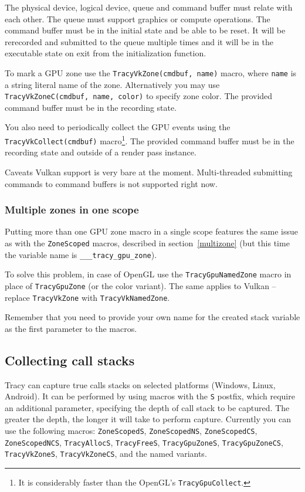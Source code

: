 \documentclass[hidelinks,titlepage,a4paper]{article}
\begin{document}
The physical device, logical device, queue and command buffer must relate with each other. The queue must support graphics or compute operations. The command buffer must be in the initial state and be able to be reset. It will be rerecorded and submitted to the queue multiple times and it will be in the executable state on exit from the initialization function.

To mark a GPU zone use the \texttt{TracyVkZone(cmdbuf, name)} macro, where \texttt{name} is a string literal name of the zone. Alternatively you may use \texttt{TracyVkZoneC(cmdbuf, name, color)} to specify zone color. The provided command buffer must be in the recording state.

You also need to periodically collect the GPU events using the \texttt{TracyVkCollect(cmdbuf)} macro\footnote{It is considerably faster than the OpenGL's \texttt{TracyGpuCollect}.}. The provided command buffer must be in the recording state and outside of a render pass instance.

\begin{bclogo}[
noborder=true,
couleur=black!5,
logo=\bcattention
]{Caveats}
Vulkan support is very bare at the moment. Multi-threaded submitting commands to command buffers is not supported right now.
\end{bclogo}

\subsubsection{Multiple zones in one scope}

Putting more than one GPU zone macro in a single scope features the same issue as with the \texttt{ZoneScoped} macros, described in section~\ref{multizone} (but this time the variable name is \texttt{\_\_\_tracy\_gpu\_zone}).

To solve this problem, in case of OpenGL use the \texttt{TracyGpuNamedZone} macro in place of \texttt{TracyGpuZone} (or the color variant). The same applies to Vulkan -- replace \texttt{TracyVkZone} with \texttt{TracyVkNamedZone}.

Remember that you need to provide your own name for the created stack variable as the first parameter to the macros.

\subsection{Collecting call stacks}

Tracy can capture true calls stacks on selected platforms (Windows, Linux, Android). It can be performed by using macros with the \texttt{S} postfix, which require an additional parameter, specifying the depth of call stack to be captured. The greater the depth, the longer it will take to perform capture. Currently you can use the following macros: \texttt{ZoneScopedS}, \texttt{ZoneScopedNS}, \texttt{ZoneScopedCS}, \texttt{ZoneScopedNCS}, \texttt{TracyAllocS}, \texttt{TracyFreeS}, \texttt{TracyGpuZoneS}, \texttt{TracyGpuZoneCS}, \texttt{TracyVkZoneS}, \texttt{TracyVkZoneCS}, and the named variants.
\end{document}
